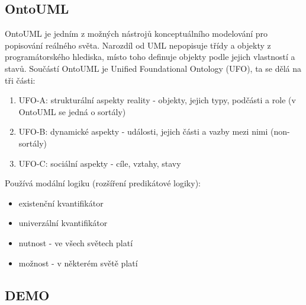 \documentclass{szzclass}
\begin{document}
\subsection{OntoUML}

OntoUML je jedním z možných nástrojů konceptuálního modelování pro popisování reálného světa. Narozdíl od UML nepopisuje třídy a objekty
z programátorského hlediska, místo toho definuje objekty podle jejich vlastností a stavů.
Součástí OntoUML je Unified Foundational Ontology (UFO), ta se dělá na tři části:
\begin{enumerate}
    \item UFO-A: strukturální aspekty reality - objekty, jejich typy, podčásti a role (v OntoUML se jedná o sortály)
    \item UFO-B: dynamické aspekty - události, jejich části a vazby mezi nimi (non-sortály)
    \item UFO-C: sociální aspekty - cíle, vztahy, stavy
\end{enumerate}

Používá modální logiku (rozšíření predikátové logiky):
\begin{itemize}
    \item existenční kvantifikátor
    \item univerzální kvantifikátor
    \item nutnost - ve všech světech platí
    \item možnost - v některém světě platí
\end{itemize}

\subsection{DEMO}
\end{document}

